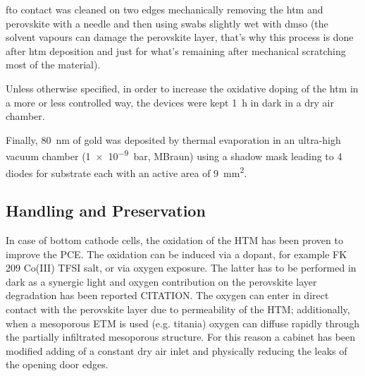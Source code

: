 			\Gls{fto} contact was cleaned on two edges mechanically removing the \gls{htm} and perovskite with a needle and then using swabs slightly wet with \gls{dmso} (the solvent vapours can damage the perovskite layer, that's why this process is done after \gls{htm} deposition and just for what's remaining after mechanical scratching most of the material).

			Unless otherwise specified, in order to increase the
			oxidative doping of the \gls{htm} in a more or less controlled way, the devices were kept \SI{1}{\hour} in dark in a dry air chamber.

			Finally, \SI{80}{\nm} of gold was deposited by thermal evaporation in an ultra-high vacuum chamber
			(\SI{1e-9}{\bar}, MBraun) using a shadow mask leading to 4 diodes for substrate each with an active area of
			\SI{9}{\mm\squared}.

	\subsection{Handling and Preservation}
		In case of bottom cathode cells, the oxidation of the HTM has been proven to improve the PCE. The oxidation can be induced via a dopant, for example FK 209 Co(III) TFSI salt\cite{Burschka2013}, or via oxygen exposure. The latter has to be performed in dark as a synergic light and oxygen contribution on the perovskite layer degradation has been reported CITATION. The oxygen can enter in direct contact with the perovskite layer due to permeability of the HTM; additionally, when a mesoporous ETM is used (e.g. titania) oxygen can diffuse rapidly through the partially infiltrated mesoporous structure. For this reason a cabinet has been modified adding of a constant dry air inlet and physically reducing the leaks of the opening door edges.

